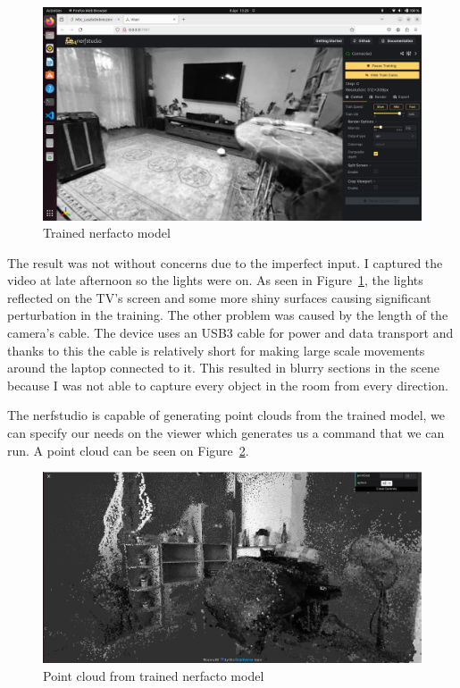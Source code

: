 \begin{figure}[htbp]
	\centering
	\includegraphics[width=150mm, keepaspectratio]{figures/trained_nerf_karcag1.png}
	\caption{Trained nerfacto model}
	\label{fig:trained_nerf_karcag}
\end{figure}

The result was not without concerns due to the imperfect input. I captured the video at late afternoon so the lights were on. As seen in Figure~\ref{fig:trained_nerf_karcag}, the lights reflected on the TV's screen and some more shiny surfaces causing significant perturbation in the training. The other problem was caused by the length of the camera's cable. The device uses an USB3 cable for power and data transport and thanks to this the cable is relatively short for making large scale movements around the laptop connected to it. This resulted in blurry sections in the scene because I was not able to capture every object in the room from every direction.

The nerfstudio is capable of generating point clouds from the trained model, we can specify our needs on the viewer which generates us a command that we can run. A point cloud can be seen on Figure~\ref{fig:nerfstudio_point_cloud}.

\begin{figure}[htbp]
	\centering
	\includegraphics[width=150mm, keepaspectratio]{figures/nerfacto_point_cloud1.png}
	\caption{Point cloud from trained nerfacto model}
	\label{fig:nerfstudio_point_cloud}
\end{figure}

